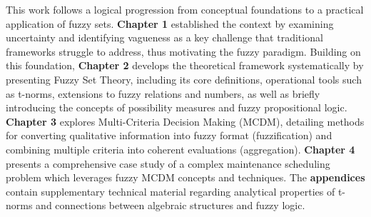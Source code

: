 This work follows a logical progression from conceptual foundations to a practical application of fuzzy sets. \textbf{Chapter 1} established the context by examining uncertainty and identifying vagueness as a key challenge that traditional frameworks struggle to address, thus motivating the fuzzy paradigm. Building on this foundation, \textbf{Chapter 2} develops the theoretical framework systematically by presenting Fuzzy Set Theory, including its core definitions, operational tools such as t-norms, extensions to fuzzy relations and numbers, as well as briefly introducing the concepts of possibility measures and fuzzy propositional logic. \textbf{Chapter 3} explores Multi-Criteria Decision Making (MCDM), detailing methods for converting qualitative information into fuzzy format (fuzzification) and combining multiple criteria into coherent evaluations (aggregation). \textbf{Chapter 4} presents a comprehensive case study of a complex maintenance scheduling problem which leverages fuzzy MCDM concepts and techniques. The \textbf{appendices} contain supplementary technical material regarding analytical properties of t-norms and connections between algebraic structures and fuzzy logic.






